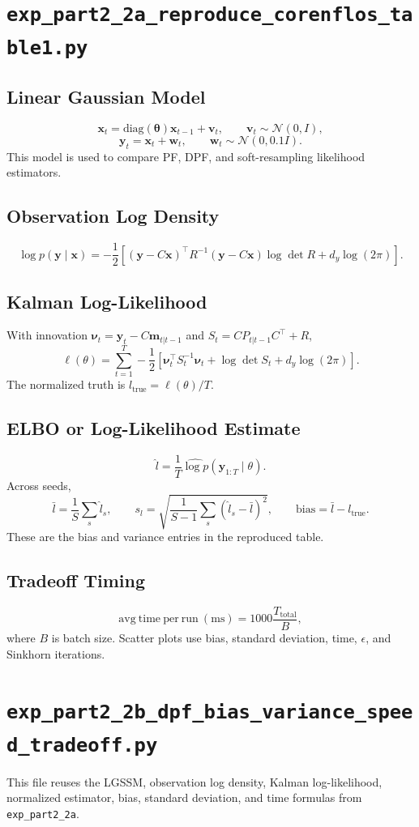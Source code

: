 \documentclass[11pt]{article}
\newcommand{\code}[1]{\texttt{#1}}
\newcommand{\diag}{\mathrm{diag}}
\begin{document}
\section{\code{exp\_part2\_2a\_reproduce\_corenflos\_table1.py}}
\subsection*{Linear Gaussian Model}
\[
\bm x_t=\diag(\bm\theta)\bm x_{t-1}+\bm v_t,\qquad
\bm v_t\sim\mathcal N(0,I),
\]
\[
\bm y_t=\bm x_t+\bm w_t,\qquad
\bm w_t\sim\mathcal N(0,0.1I).
\]
This model is used to compare PF, DPF, and soft-resampling likelihood estimators.

\subsection*{Observation Log Density}
\[
\log p(\bm y\mid\bm x)
=-\frac12\left[
(\bm y-C\bm x)^\top R^{-1}(\bm y-C\bm x)
\log\det R+d_y\log(2\pi)
\right].
\]

\subsection*{Kalman Log-Likelihood}
With innovation \(\bm\nu_t=\bm y_t-C\bm m_{t|t-1}\) and
\(S_t=CP_{t|t-1}C^\top+R\),
\[
\ell(\theta)=\sum_{t=1}^{T}
-\frac12\left[
\bm\nu_t^\top S_t^{-1}\bm\nu_t+\log\det S_t+d_y\log(2\pi)
\right].
\]
The normalized truth is \(l_{\mathrm{true}}=\ell(\theta)/T\).

\subsection*{ELBO or Log-Likelihood Estimate}
\[
\hat l=\frac{1}{T}\widehat{\log p}(\bm y_{1:T}\mid\theta).
\]
Across seeds,
\[
\bar l=\frac{1}{S}\sum_s\hat l_s,\qquad
s_l=\sqrt{\frac{1}{S-1}\sum_s(\hat l_s-\bar l)^2},\qquad
\mathrm{bias}=\bar l-l_{\mathrm{true}}.
\]
These are the bias and variance entries in the reproduced table.

\subsection*{Tradeoff Timing}
\[
\mathrm{avg\ time\ per\ run\ (ms)}=1000\frac{T_{\mathrm{total}}}{B},
\]
where \(B\) is batch size. Scatter plots use bias, standard deviation, time, \(\epsilon\), and Sinkhorn iterations.

\section{\code{exp\_part2\_2b\_dpf\_bias\_variance\_speed\_tradeoff.py}}
This file reuses the LGSSM, observation log density, Kalman log-likelihood, normalized estimator, bias, standard deviation, and time formulas from \code{exp\_part2\_2a}.
\end{document}
